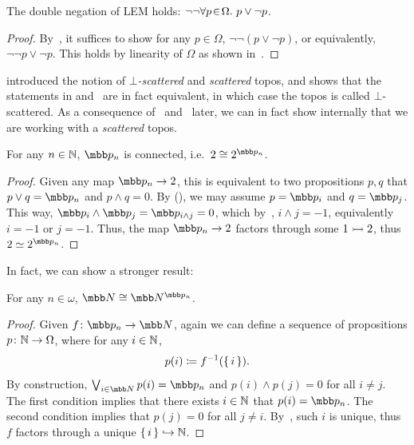 \begin{corollary}\label{negnegBoo}
  The double negation of \gls{LEM} holds: $\neg\neg\forall p\!\in\!\Omega.\ p \vee \neg p$.
\end{corollary}
\begin{proof}
  By~, it suffices to show for any $p\in\Omega$, $\neg\neg(p \vee \neg p)$, or equivalently, $\neg\neg p \vee \neg p$. This holds by linearity of $\Omega$ as shown in~.
\end{proof}

\begin{remark}\label{scatterlogic}
  \cite{ESAKIA200097} introduced the notion of \emph{$\bot$-scattered} and \emph{scattered} topos, and shows that the statements in  and~ are in fact equivalent, in which case the topos is called $\bot$-scattered. As a consequence of~ and~ later, we can in fact show internally that we are working with a \emph{scattered} topos.
\end{remark}

\begin{lemma}\label{internallyconnected}
  For any $n\in\mathbb{N}$, $\mbb p_n$ is connected, i.e.\ $2 \cong 2^{\mbb p_n}$. 
\end{lemma}
\begin{proof}
  Given any map $\mbb p_n \to 2$, this is equivalent to two propositions $p,q$ that $p \vee q = \mbb p_n$ and $p \wedge q = 0$. By (\AxiomGR), we may assume $p = \mbb p_i$ and $q = \mbb p_j$. This way, $\mbb p_i \wedge \mbb p_j = \mbb p_{i \wedge j} = 0$, which by~, $i \wedge j = -1$, equivalently $i = -1$ or $j = -1$. Thus, the map $\mbb p_n \to 2$ factors through some $1 \rightarrowtail 2$, thus $2 \simeq 2^{\mbb p_n}$.
\end{proof}

In fact, we can show a stronger result:

\begin{lemma}\label{interallyconconnected}
  For any $n\in\omega$, $\N \cong \N^{\mbb p_n}$.
\end{lemma}
\begin{proof}
  Given $f \colon \mbb p_n \to \N$, again we can define a sequence of propositions $p \colon \mathbb{N} \to \Omega$, where for any $i\in\mathbb{N}$,
  \[ p(i) \coloneq f^{\mathrm{-1}}(\{\,i\,\}). \]
  By construction, $\bigvee_{i\in\N}p(i) = \mbb p_n$ and $p(i) \wedge p(j) = 0$ for all $i \neq j$. The first condition implies that there exists $i\in\mathbb{N}$ that $p(i) = \mbb p_n$. The second condition implies that $p(j) = 0$ for all $j \neq i$. By~, such $i$ is unique, thus $f$ factors through a unique $\{\,i\,\} \hookrightarrow \mathbb{N}$.
\end{proof}

